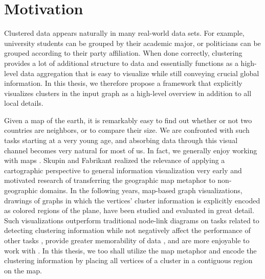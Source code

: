 \section{Motivation}
\label{sect:motivation}

Clustered data appears naturally in many real-world data sets.
For example, university students can be grouped by their academic major, or politicians can be grouped according to their party affiliation.
When done correctly, clustering provides a lot of additional structure to data and essentially functions as a high-level data aggregation that is easy to visualize while still conveying crucial global information.
In this thesis, we therefore propose a framework that explicitly visualizes clusters in the input graph as a high-level overview in addition to all local details.

Given a map of the earth, it is remarkably easy to find out whether or not two countries are neighbors, or to compare their size.
We are confronted with such tasks starting at a very young age, and absorbing data through this visual channel becomes very natural for most of us.
In fact, we generally enjoy working with maps \cite{saket2016comparing}.
Skupin and Fabrikant \cite{skupin2003spatialization} realized the relevance of applying a cartographic perspective to general information visualization very early and motivated research of transferring the geographic map metaphor to non-geographic domains.
In the following years, map-based graph visualizations, \ie{} drawings of graphs in which the vertices' cluster information is explicitly encoded as colored regions of the plane, have been studied and evaluated in great detail.
Such visualizations outperform traditional node-link diagrams on tasks related to detecting clustering information while not negatively affect the performance of other tasks \cite{saket2014node}, provide greater memorability of data \cite{saket2015map}, and are more enjoyable to work with \cite{saket2016comparing}.
In this thesis, we too shall utilize the map metaphor and encode the clustering information by placing all vertices of a cluster in a contiguous region on the map.

